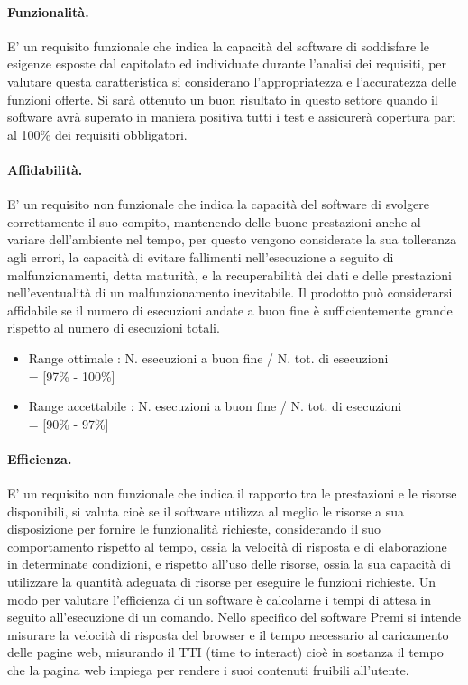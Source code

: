 \paragraph{Funzionalità.}

E' un requisito funzionale che indica la capacità del software di soddisfare le esigenze esposte dal capitolato ed individuate durante l'analisi dei requisiti, per valutare questa caratteristica si considerano l'appropriatezza e l'accuratezza delle funzioni offerte. Si sarà ottenuto un buon risultato in questo settore quando il software avrà superato in maniera positiva tutti i test e assicurerà copertura pari al 100\% dei requisiti obbligatori.

\paragraph{Affidabilità.}

E' un requisito non funzionale che indica la capacità del software di svolgere correttamente il suo compito, mantenendo delle buone prestazioni anche al variare dell'ambiente nel tempo, per questo vengono considerate la sua tolleranza agli errori, la capacità di evitare fallimenti nell'esecuzione a seguito di malfunzionamenti, detta maturità, e la recuperabilità dei dati e delle prestazioni nell'eventualità di un
malfunzionamento inevitabile. Il prodotto può considerarsi affidabile se il numero di esecuzioni andate a buon fine è sufficientemente grande rispetto al numero di esecuzioni totali.
\begin{itemize}
	\item Range ottimale :  N. esecuzioni a buon fine / N. tot. di esecuzioni\\ = [97\% - 100\%]
	\item Range accettabile :  N. esecuzioni a buon fine / N. tot. di esecuzioni\\ = [90\% - 97\%]
\end{itemize}

\paragraph{Efficienza.}
E' un requisito non funzionale che indica il rapporto tra le prestazioni e le risorse disponibili, si valuta cioè se il software utilizza al meglio le risorse a sua disposizione per fornire le funzionalità richieste, considerando il suo comportamento rispetto al tempo, ossia la velocità di risposta e di elaborazione in determinate condizioni, e rispetto all'uso delle risorse, ossia la sua capacità di utilizzare la quantità adeguata di risorse per eseguire le funzioni richieste. Un modo per valutare l'efficienza di un software è calcolarne i tempi di attesa in seguito all'esecuzione di un comando. Nello specifico del software Premi si intende misurare la velocità di risposta del browser e il tempo necessario al caricamento delle pagine web, misurando il  TTI (time to interact) cioè in sostanza il tempo che la pagina web impiega per rendere i suoi contenuti fruibili all'utente.

